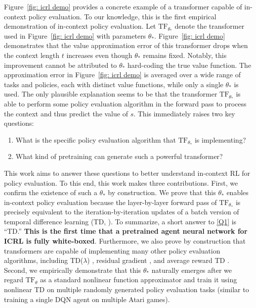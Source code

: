 \documentclass{article}
\newcommand{\tb}[1]{{\textbf{#1}}}
\newcommand{\tf}{\text{TF}}
\begin{document}
Figure~\ref{fig: icrl demo} provides a concrete example of a transformer capable of in-context policy evaluation.
To our knowledge, this is the first empirical demonstration of in-context policy evaluation.
Let $\tf_{\theta_*}$ denote the transformer used in Figure~\ref{fig: icrl demo} with parameters $\theta_*$.
Figure~\ref{fig: icrl demo} demonstrates that the value approximation error of this transformer drops when the context length $t$ increases even though $\theta_*$ remains fixed.
Notably, this improvement cannot be attributed to $\theta_*$ hard-coding the true value function.
The approximation error in Figure~\ref{fig: icrl demo} is averaged over a wide range of tasks and policies, each with distinct value functions, while only a single $\theta_*$ is used.
The only plausible explanation seems to be that the transformer $\tf_{\theta_*}$ is able to perform some policy evaluation algorithm in the forward pass to process the context and thus predict the value of $s$.
This immediately raises two key questions:
\begin{enumerate}[topsep=0pt,itemsep=-1ex,partopsep=1ex,parsep=1ex, start=1, label={ (Q\arabic*)}]
    \item What is the specific policy evaluation algorithm that $\tf_{\theta_*}$ is implementing? \label{Q1}
    \item What kind of pretraining can generate such a powerful transformer? \label{Q2}
\end{enumerate}
This work aims to answer these questions to better understand in-context RL for policy evaluation.
To this end, this work makes three contributions.
First, we confirm the existence of such a $\theta_*$ by construction.
We prove that this $\theta_*$ enables in-context policy evaluation because the layer-by-layer forward pass of $\tf_{\theta_*}$ is precisely equivalent to the iteration-by-iteration updates of a batch version of temporal difference learning (TD, \citet{sutton1988learning}).
To summarize, a short answer to \ref{Q1} is ``TD.''
\tb{This is the first time that a pretrained agent neural network for ICRL is fully white-boxed}.
Furthermore,
we also prove by construction that transformers are capable of implementing many other policy evaluation algorithms, including TD($\lambda$) \citep{sutton1988learning}, residual gradient \citep{baird1995residual}, and average reward TD \citep{tsitsiklis1999average}.
Second, we empirically demonstrate that this $\theta_*$ naturally emerges after we regard $\tf_\theta$ as a standard nonlinear function approximator and train it using nonlinear TD on multiple randomly generated policy evaluation tasks (similar to training a single DQN agent on multiple Atari games).
\end{document}
